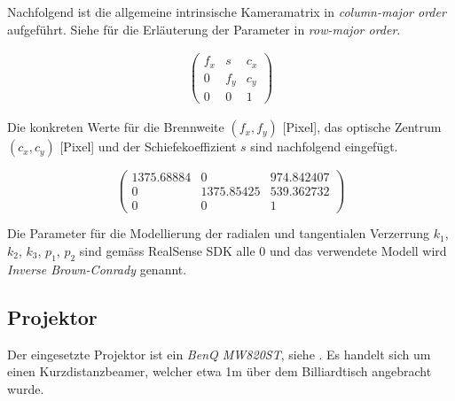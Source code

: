 Nachfolgend ist die allgemeine intrinsische Kameramatrix in \emph{column-major order} aufgeführt.
Siehe \cite{matlab:what_is_camera_calibration} für die Erläuterung der Parameter in \emph{row-major order}.

\begin{align}
    \begin{pmatrix}
        f_x & s   & c_x\\
        0   & f_y & c_y\\
        0   & 0   & 1
    \end{pmatrix}
\end{align}

Die konkreten Werte für die Brennweite $(f_x, f_y)$ [Pixel], das optische Zentrum $(c_x, c_y)$ [Pixel]
und der Schiefekoeffizient $s$ sind nachfolgend eingefügt.

\begin{equation}
    \begin{pmatrix}
        1375.68884 & 0          & 974.842407\\
        0          & 1375.85425 & 539.362732\\
        0          & 0          & 1
    \end{pmatrix}
\end{equation}

Die Parameter für die Modellierung der radialen und tangentialen Verzerrung $k_1$, $k_2$, $k_3$, $p_1$, $p_2$ sind gemäss
RealSense SDK alle 0 und das verwendete Modell wird \emph{Inverse Brown-Conrady} genannt.

\subsection{Projektor}\label{kap:projector}

Der eingesetzte Projektor ist ein \emph{BenQ MW820ST}, siehe \cite{projectorcentral:benq_mw820st}.
Es handelt sich um einen Kurzdistanzbeamer, welcher etwa 1\si{\metre} über dem Billiardtisch angebracht wurde.

